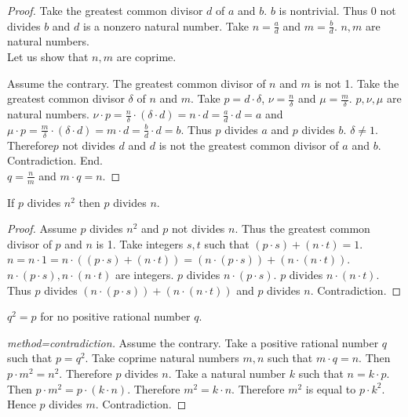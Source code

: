 \documentclass{article}
\begin{document}
\begin{forthel}
\begin{proof}
Take the greatest common divisor $d$ of $a$ and $b$. $b$ is nontrivial. Thus 0 not divides $b$ and $d$ is a nonzero natural number.
Take $n = \frac{a}{d}$ and $m = \frac{b}{d}$. $n,m$ are natural numbers.\\

Let us show that $n,m$ are coprime.

  Assume the contrary. The greatest common divisor of $n$ and $m$ is not 1. Take the greatest common divisor $\delta$ of $n$ and $m$.
  Take $p = d \cdot \delta$, $\nu = \frac{n}{\delta}$ and $\mu = \frac{m}{\delta}$. $p,\nu,\mu$ are natural numbers.
  $\nu \cdot p = \frac{n}{\delta} \cdot (\delta \cdot d) = n \cdot d = \frac{a}{d} \cdot d = a$ and
  $\mu \cdot p = \frac{m}{\delta} \cdot (\delta \cdot d) = m \cdot d = \frac{b}{d} \cdot d = b$.
  Thus $p$ divides $a$ and $p$ divides $b$. $\delta \neq 1$.
  Therefore$p$ not divides $d$ and $d$ is not the greatest common divisor of $a$ and $b$. Contradiction.
End.\\

$q = \frac{n}{m}$ and $m \cdot q = n$.
\end{proof}

    \begin{lemma}
      If $p$ divides $n^{2}$ then $p$ divides $n$.
    \end{lemma}
    \begin{proof}
      Assume $p$ divides $n^{2}$ and $p$ not divides $n$. Thus the greatest common divisor of $p$ and $n$ is 1.
      Take integers $s,t$ such that $(p \cdot s) + (n \cdot t) = 1$.
      $n = n \cdot 1 = n \cdot ((p \cdot s) + (n \cdot t)) = (n \cdot (p \cdot s)) + (n \cdot (n \cdot t))$.
      $n \cdot (p \cdot s), n \cdot (n \cdot t)$ are integers.
      $p$ divides $n \cdot (p \cdot s)$. $p$ divides $n \cdot (n \cdot t)$.
      Thus $p$ divides $(n \cdot (p \cdot s)) + (n \cdot (n \cdot t))$ and $p$ divides $n$. Contradiction.
    \end{proof}


    \begin{theorem}[title=Pythagoras]
      $q^{2} = p$ for no positive rational number $q$.
    \end{theorem}
    \begin{proof}[method=contradiction]
      Assume the contrary.
      Take a positive rational number $q$ such that $p = q^{2}$.
      Take coprime natural numbers $m,n$ such that $m \cdot q = n$.
      Then $p \cdot m^{2} = n^{2}$.
      Therefore $p$ divides $n$.
      Take a natural number $k$ such that $n = k \cdot p$.
      Then $p \cdot m^{2} = p \cdot (k \cdot n)$.
      Therefore $m^{2} = k \cdot n$.
      Therefore $m^{2}$ is equal to $p \cdot k^{2}$.
      Hence $p$ divides $m$.
      Contradiction.
    \end{proof}
  \end{forthel}
\end{document}
